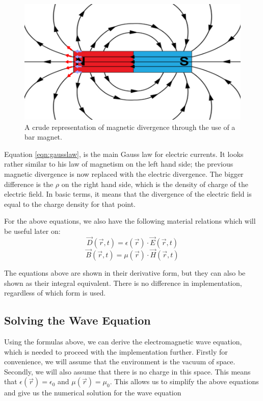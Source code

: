 \begin{figure}
	\centering
	\includegraphics[scale=0.9]{Figures/magneticdivergence}
	\decoRule
	\caption[Magnetic Divergence]{A crude representation of magnetic divergence through the use of a bar magnet.}
	\label{fig:magneticdivergence}
\end{figure}

Equation \ref{eqn:gausslaw}, is the main Gauss law for electric currents. It looks rather similar to his law of magnetism on the left hand side; the previous magnetic divergence is now replaced with the electric divergence. The bigger difference is the $\rho$ on the right hand side, which is the density of charge of the electric field. In basic terms, it means that the divergence of the electric field is equal to the charge density for that point.

For the above equations, we also have the following material relations which will be useful later on:
\begin{equation}
	 \vec{D}(\vec{r},t) = \epsilon(\vec{r}) \cdot \vec{E}(\vec{r},t)
\end{equation}
\begin{equation}
	\vec{B}(\vec{r},t) = \mu(\vec{r}) \cdot \vec{H}(\vec{r},t)
\end{equation}

The equations above are shown in their derivative form, but they can also be shown as their integral equivalent. There is no difference in implementation, regardless of which form is used.


\subsection{Solving the Wave Equation}
Using the formulas above, we can derive the electromagnetic wave equation, which is needed to proceed with the implementation further. Firstly for convenience, we will assume that the environment is the vacuum of space. Secondly, we will also assume that there is no charge in this space. This means that $\epsilon(\vec{r})=\epsilon_{0}$ and $\mu(\vec{r})=\mu_{0}$. This allows us to simplify the above equations and give us the numerical solution for the wave equation

